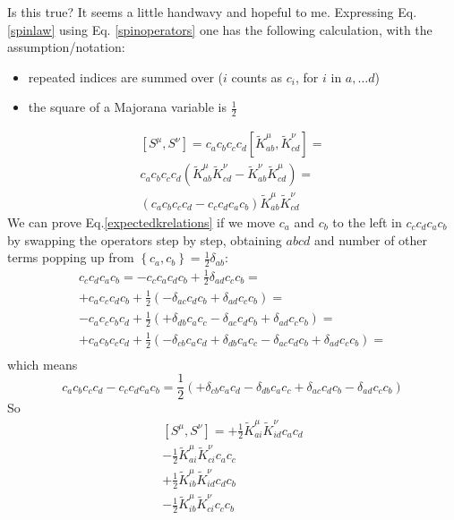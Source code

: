 \documentclass{article}
\newcommand{\ktilde}{\tilde{K}}
\newcommand{\onehalf}{\frac{1}{2}}
\begin{document}
Is this true? It seems a little handwavy and hopeful to me.
Expressing Eq.\ref{spinlaw} using Eq. \ref{spinoperators}
one has the following calculation, with the assumption/notation:
\begin{itemize}
\item repeated indices are summed over ($i$ counts as $c_i$, for $i$ in $a,\ldots d$)
\item the square of a Majorana variable is $\onehalf$
\end{itemize}
\begin{equation}
\begin{aligned}
  \left[S^\mu,S^\nu\right] = c_ac_bc_cc_d \left[ \ktilde^\mu_{ab}, \ktilde^\nu_{cd} \right] = \\
c_ac_bc_cc_d \left( \ktilde^\mu_{ab} \ktilde^\nu_{cd} -  \ktilde^\nu_{ab} \ktilde^\mu_{cd}\right) = \\
(c_ac_bc_cc_d - c_cc_dc_ac_b) \ktilde^\mu_{ab} \ktilde^\nu_{cd}
\end{aligned}
\end{equation}
We can prove Eq.\ref{expectedkrelations} if we move $c_a$ and $c_b$ to the left in $c_cc_dc_ac_b$
by swapping the operators step by step,
obtaining $abcd$ and number of other terms popping up from
$\left\{c_a,c_b \right\} = \onehalf \delta_{ab}$:
\begin{equation}
  \begin{aligned}
    c_cc_d c_ac_b = - c_cc_ac_dc_b + \onehalf \delta_{ad} c_cc_b = \\
    + c_ac_cc_dc_b + \onehalf \left(- \delta_{ac} c_dc_b + \delta_{ad} c_cc_b \right)= \\
    - c_ac_cc_bc_d + \onehalf \left(+ \delta_{db} c_ac_c - \delta_{ac} c_dc_b + \delta_{ad} c_cc_b \right)= \\
    + c_ac_bc_cc_d + \onehalf \left(- \delta_{cb} c_ac_d + \delta_{db} c_ac_c - \delta_{ac} c_dc_b + \delta_{ad} c_cc_b \right)= \\
  \end{aligned}
\end{equation}
which means
\begin{equation}
     c_ac_bc_cc_d - c_cc_dc_ac_b = \onehalf \left(+ \delta_{cb} c_ac_d - \delta_{db} c_ac_c + \delta_{ac} c_dc_b - \delta_{ad} c_cc_b \right)
\end{equation}
So
\begin{equation}
  \begin{aligned}
\left[S^\mu,S^\nu\right]  = + \onehalf \ktilde^\mu_{ai} \ktilde^\nu_{id} c_ac_d \\
                           - \onehalf \ktilde^\mu_{ai}  \ktilde^\nu_{ci} c_ac_c \\
                           + \onehalf \ktilde^\mu_{ib}  \ktilde^\nu_{id} c_dc_b \\
                           - \onehalf \ktilde^\mu_{ib}  \ktilde^\nu_{ci} c_cc_b
  \end{aligned}
\end{equation}
\end{document}
